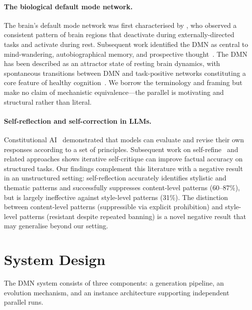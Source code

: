 \documentclass{article}
\begin{document}
\paragraph{The biological default mode network.}
The brain's default mode network was first characterised by
\citet{raichle2001default}, who observed a consistent pattern of brain regions
that deactivate during externally-directed tasks and activate during rest.
Subsequent work identified the DMN as central to mind-wandering, autobiographical
memory, and prospective thought~\citep{buckner2008brain}. The DMN has been
described as an attractor state of resting brain dynamics, with spontaneous
transitions between DMN and task-positive networks constituting a core feature
of healthy cognition~\citep{poerio2025dmn}. We borrow
the terminology and framing but make no claim of mechanistic equivalence---the
parallel is motivating and structural rather than literal.

\paragraph{Self-reflection and self-correction in LLMs.}
Constitutional AI~\citep{bai2022constitutional} demonstrated that models can
evaluate and revise their own responses according to a set of principles.
Subsequent work on self-refine~\citep{madaan2023selfrefine} and
related approaches shows iterative self-critique can improve factual accuracy
on structured tasks. Our findings complement this literature with a negative
result in an unstructured setting: self-reflection accurately identifies
stylistic and thematic patterns and successfully suppresses content-level
patterns (60--87\%), but is largely ineffective against style-level patterns
(31\%). The distinction between content-level patterns (suppressible via
explicit prohibition) and style-level patterns (resistant despite repeated
banning) is a novel negative result that may generalise beyond our setting.

\section{System Design}
\label{sec:system}

The DMN system consists of three components: a generation pipeline, an
evolution mechanism, and an instance architecture supporting independent
parallel runs.
\end{document}
